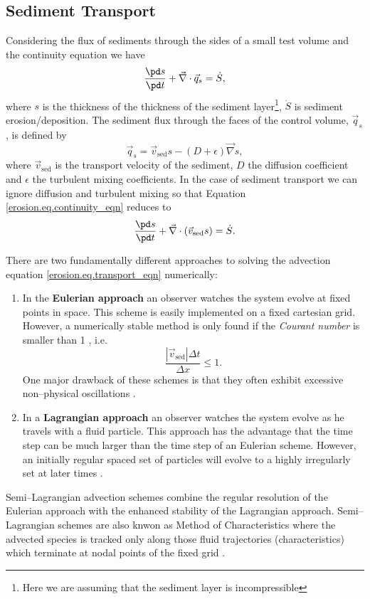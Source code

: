 \subsection{Sediment Transport}
Considering the flux of sediments through the sides of a small test volume and the continuity equation we have
\begin{equation}
  \label{erosion.eq.continuity_eqn}
  \frac{\pd s}{\pd t}+\vec\nabla\cdot\vec{q}_s=\dot{S},
\end{equation}
where $s$ is the thickness of the thickness of the sediment layer\footnote{Here we are assuming that the sediment layer is incompressible}, $\dot{S}$ is sediment erosion/deposition. The sediment flux through the faces of the control volume, $\vec{q}_s$, is defined by
\begin{equation}
  \vec{q}_s=\vec{v}_{\text{sed}}s-(D+\epsilon)\vec\nabla s,
\end{equation}
where $\vec{v}_{\text{sed}}$ is the transport velocity of the sediment, $D$ the diffusion coefficient and $\epsilon$ the turbulent mixing coefficients. In the case of sediment transport we can ignore diffusion and turbulent mixing so that Equation \eqref{erosion.eq.continuity_eqn} reduces to
\begin{equation}
  \label{erosion.eq.transport_eqn}
  \frac{\pd s}{\pd t}+\vec\nabla\cdot(\vec{v}_{\text{sed}}s)=\dot{S}.
\end{equation}

There are two fundamentally different approaches to solving the advection equation \eqref{erosion.eq.transport_eqn} numerically:
\begin{enumerate}
\item In the \textbf{Eulerian approach} an observer watches the system evolve at fixed points in space. This scheme is easily implemented on a fixed cartesian grid. However, a numerically stable method is only found if the \emph{Courant number} is smaller than 1 \citep{num.1}, i.e.
  \begin{equation}
    \frac{|\vec{v}_{\text{sed}}|\Delta t}{\Delta x}\le1.
  \end{equation}
  One major drawback of these schemes is that they often exhibit excessive non--physical oscillations \citep{transport.9}.
\item In a \textbf{Lagrangian approach} an observer watches the system evolve as he travels with a fluid particle. This approach has the advantage that the time step can be much larger than the time step of an Eulerian scheme. However, an initially regular spaced set of particles will evolve to a highly irregularly set at later times \citep{transport.8}.
\end{enumerate}
Semi--Lagrangian advection schemes combine the regular resolution of the Eulerian approach with the enhanced stability of the Lagrangian approach. Semi--Lagrangian schemes are also knwon as Method of Characteristics where the advected species is tracked only along those fluid trajectories (characteristics) which terminate at nodal points of the fixed grid \citep{transport.3}.

